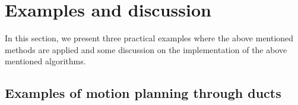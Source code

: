\documentclass[12pt,a4]{article}
\begin{document}
%

%

\section{Examples and discussion}
\label{sec:Examples}
In this section, we present three practical examples where the above mentioned methods are applied and some discussion on the implementation of the above mentioned algorithms.
\subsection{Examples of motion planning through ducts}
\end{document}
